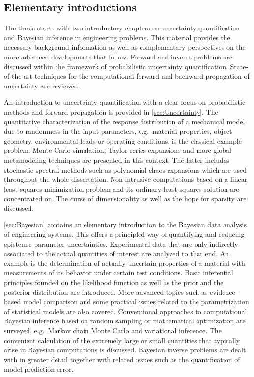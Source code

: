 \begin{refsection}
\subsection{Elementary introductions}
The thesis starts with two introductory chapters on uncertainty quantification and Bayesian inference in engineering problems.
This material provides the necessary background information as well as complementary perspectives on the more advanced developments that follow.
Forward and inverse problems are discussed within the framework of probabilistic uncertainty quantification.
State-of-the-art techniques for the computational forward and backward propagation of uncertainty are reviewed.
\par %
An introduction to uncertainty quantification with a clear focus on probabilistic methods and forward propagation is provided in \cref{sec:Uncertainty}.
The quantitative characterization of the response distribution of a mechanical model due to randomness in the input parameters,
e.g.\ material properties, object geometry, environmental loads or operating conditions, is the classical example problem.
Monte Carlo simulation, Taylor series expansions and more global metamodeling techniques are presented in this context.
The latter includes stochastic spectral methods such as polynomial chaos expansions which are used throughout the whole dissertation.
Non-intrusive computations based on a linear least squares minimization problem and its ordinary least squares solution are concentrated on.
The curse of dimensionality as well as the hope for sparsity are discussed.
\par %
\cref{sec:Bayesian} contains an elementary introduction to the Bayesian data analysis of engineering systems.
This offers a principled way of quantifying and reducing epistemic parameter uncertainties.
Experimental data that are only indirectly associated to the actual quantities of interest are analyzed to that end.
An example is the determination of actually uncertain properties of a material with measurements of its behavior under certain test conditions.
Basic inferential principles founded on the likelihood function as well as the prior and the posterior distribution are introduced.
More advanced topics such as evidence-based model comparison and some practical issues related to the parametrization of statistical models are also covered.
Conventional approaches to computational Bayesian inference based on random sampling or mathematical optimization are surveyed, e.g.\ Markov chain Monte Carlo and variational inference.
The convenient calculation of the extremely large or small quantities that typically arise in Bayesian computations is discussed.
Bayesian inverse problems are dealt with in greater detail together with related issues such as the quantification of model prediction error.


\end{refsection}
